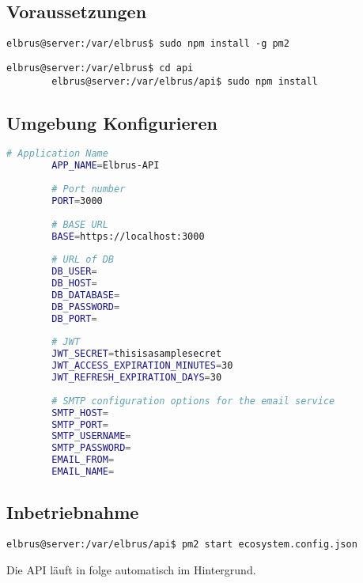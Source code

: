 	\subsection{Voraussetzungen}
	
	\lstset{style=commands}
	\begin{lstlisting}[caption={Installieren von 'pm2'.}]
		elbrus@server:/var/elbrus$ sudo npm install -g pm2
	\end{lstlisting}
	
	\lstset{style=commands}
	\begin{lstlisting}[caption={Nachinstallieren der Abhängigkeiten.}]
		elbrus@server:/var/elbrus$ cd api
		elbrus@server:/var/elbrus/api$ sudo npm install
	\end{lstlisting}
	\newpage
	
	\subsection[file config]{Umgebung Konfigurieren}
	
	\lstset{style=files}
	\begin{lstlisting}[caption={Anhand von '.env.example' eigene '.env' Datei anlegen.}, language=bash]
		# Application Name
		APP_NAME=Elbrus-API
		
		# Port number
		PORT=3000
		
		# BASE URL
		BASE=https://localhost:3000
		
		# URL of DB
		DB_USER=
		DB_HOST=
		DB_DATABASE=
		DB_PASSWORD=
		DB_PORT=
		
		# JWT
		JWT_SECRET=thisisasamplesecret
		JWT_ACCESS_EXPIRATION_MINUTES=30
		JWT_REFRESH_EXPIRATION_DAYS=30
		
		# SMTP configuration options for the email service
		SMTP_HOST=
		SMTP_PORT=
		SMTP_USERNAME=
		SMTP_PASSWORD=
		EMAIL_FROM=
		EMAIL_NAME=
	\end{lstlisting}
	
	\subsection{Inbetriebnahme}
	
	\lstset{style=commands}
	\begin{lstlisting}[caption={Starten der API.}]
		elbrus@server:/var/elbrus/api$ pm2 start ecosystem.config.json
	\end{lstlisting}
	Die API läuft in folge automatisch im Hintergrund.
	\newpage
	
